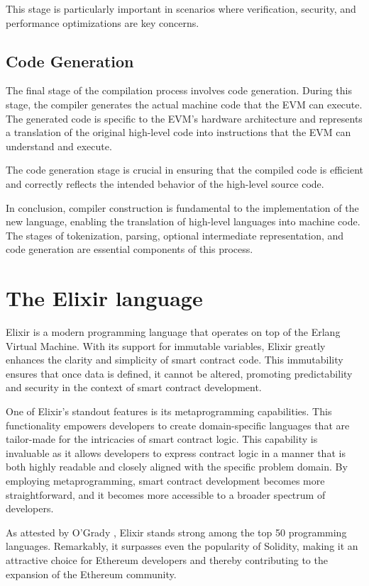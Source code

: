 This stage is particularly important in scenarios where verification, security, and performance optimizations are key concerns.

\subsection{Code Generation}

The final stage of the compilation process involves code generation. During this stage, the compiler generates the actual machine code that the EVM can execute. The generated code is specific to the EVM's hardware architecture and represents a translation of the original high-level code into instructions that the EVM can understand and execute.

The code generation stage is crucial in ensuring that the compiled code is efficient and correctly reflects the intended behavior of the high-level source code.


In conclusion, compiler construction is fundamental to the implementation of the new language, enabling the translation of high-level languages into machine code. The stages of tokenization, parsing, optional intermediate representation, and code generation are essential components of this process.

\section{The Elixir language}
\label{sec:ex}

Elixir is a modern programming language that operates on top of the Erlang Virtual Machine. With its support for immutable variables, Elixir greatly enhances the clarity and simplicity of smart contract code. This immutability ensures that once data is defined, it cannot be altered, promoting predictability and security in the context of smart contract development.

One of Elixir's standout features is its metaprogramming capabilities. This functionality empowers developers to create domain-specific languages that are tailor-made for the intricacies of smart contract logic. This capability is invaluable as it allows developers to express contract logic in a manner that is both highly readable and closely aligned with the specific problem domain. By employing metaprogramming, smart contract development becomes more straightforward, and it becomes more accessible to a broader spectrum of developers.

As attested by O'Grady \cite{RedMonk}, Elixir stands strong among the top 50 programming languages. Remarkably, it surpasses even the popularity of Solidity, making it an attractive choice for Ethereum developers and thereby contributing to the expansion of the Ethereum community.

